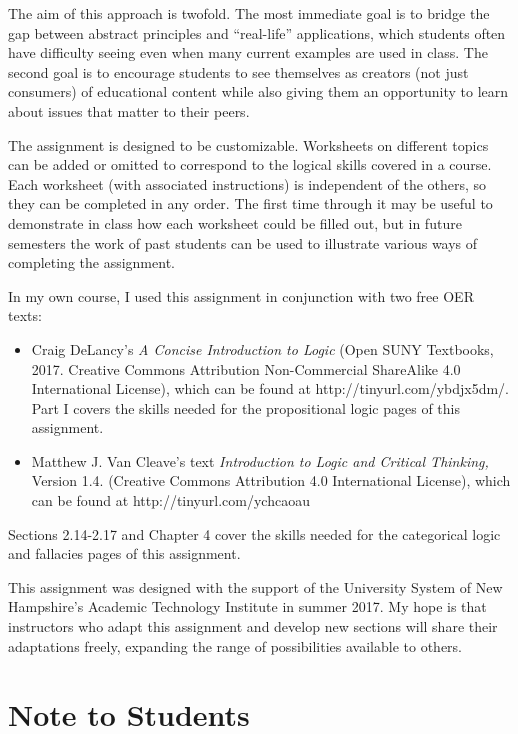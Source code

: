 \documentclass[oneside, openany]{book} %
\begin{document}
The aim of this approach is twofold. The most immediate goal is to bridge the gap between abstract principles and ``real-life'' applications, which students often have difficulty seeing even when many current examples are used in class. The second goal is to encourage students to see themselves as creators (not just consumers) of educational content while also giving them an opportunity to learn about issues that matter to their peers.

The assignment is designed to be customizable. Worksheets on different topics can be added or omitted to correspond to the logical skills covered in a course. Each worksheet (with associated instructions) is independent of the others, so they can be completed in any order. The first time through it may be useful to demonstrate in class how each worksheet could be filled out, but in future semesters the work of past students can be used to illustrate various ways of completing the assignment.

In my own course, I used this assignment in conjunction with two free OER texts:

 \begin{itemize}[label=\textbullet, topsep=0pt] 

\item Craig DeLancy's \textit{A Concise Introduction to Logic }(Open SUNY Textbooks, 2017. Creative Commons Attribution Non-Commercial ShareAlike 4.0 International License), which can be found at http://tinyurl.com/ybdjx5dm/. Part I covers the skills needed for the propositional logic pages of this assignment.

\item Matthew J. Van Cleave's text \textit{Introduction to Logic and Critical Thinking, }Version 1.4. (Creative Commons Attribution 4.0 International License), which can be found at http://tinyurl.com/ychcaoau

\end{itemize}

\noindent Sections 2.14-2.17 and Chapter 4 cover the skills needed for the categorical logic and fallacies pages of this assignment.
 
This assignment was designed with  the support of the University System of New  Hampshire's Academic Technology Institute in summer 2017.  My hope  is that  instructors who  adapt this assignment and develop new sections will share their adaptations freely, expanding the range of possibilities available to others.


\chapter{Note to Students}
\end{document}
